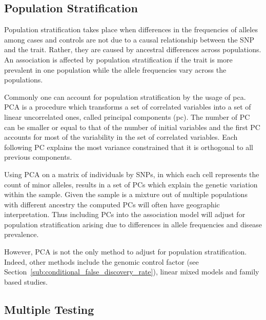 \subsection{Population Stratification}
\label{ssec:population_stratification}

Population stratification takes place when differences in the frequencies of alleles among cases and controls are not due to a causal relationship between the SNP and the trait.
Rather, they are caused by ancestral differences across populations.
An association is affected by population stratification if the trait is more prevalent in one population while the allele frequencies vary across the populations.

Commonly one can account for population stratification by the usage of \acrfull{pca}.
PCA is a procedure which transforms a set of correlated variables into a set of linear uncorrelated ones, called principal components (\acrshort{pc}).
The number of PC can be smaller or equal to that of the number of initial variables and the first PC accounts for most of the variability in the set of correlated variables.
Each following PC explains the most variance constrained that it is orthogonal to all previous components.

Using PCA on a matrix of individuals by SNPs, in which each cell represents the count of minor alleles, results in a set of PCs which explain the genetic variation within the sample.
Given the sample is a mixture out of multiple populations with different ancestry the computed PCs will often have geographic interpretation.
Thus including PCs into the association model will adjust for population stratification arising due to differences in allele frequencies and disease prevalence.

However, PCA is not the only method to adjust for population stratification.
Indeed, other methods include the genomic control factor (see Section~\ref{sub:conditional_false_discovery_rate}), linear mixed models and family based studies.

\subsection{Multiple Testing}
\label{ssec:multiple_testing}

